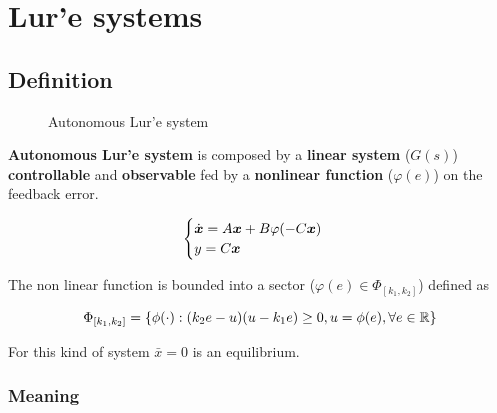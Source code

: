 \chapter{Lur'e systems}

\section{Definition}

\begin{figure}[htb]
    \centering
    \caption{Autonomous Lur'e system}
    \label{fig:lure-system}
\end{figure}

\textbf{Autonomous Lur'e system} is composed by a \textbf{linear system} ($G(s)$) \textbf{controllable} and \textbf{observable} fed by a \textbf{nonlinear function} ($\varphi(e)$) on the feedback error.

\[
    \begin{cases}
        \dot{\boldsymbol{x}} = A \boldsymbol{x} + B \varphi(-C\boldsymbol{x}) \\
        y = C \boldsymbol{x}
    \end{cases}
\]

The non linear function is bounded into a sector ($\varphi(e) \in \Phi_{[k_1,k_2]}$) defined as

\[
    \Phi_{[k_1,k_2]} = \{\phi(\cdot) : (k_2 e -u)(u - k_1 e) \geq 0, u=\phi(e), \forall e \in \mathbb{R} \}
\]

For this kind of system $\bar{x} = 0$ is an equilibrium.

\subsection{Meaning}

